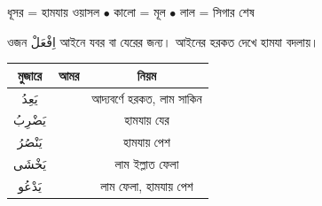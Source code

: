 \vspace{0.2cm}

\begin{center}
  {\small
    ধূসর = হামযায় ওয়াসল
    \enspace$\bullet$\enspace
    কালো = মূল
    \enspace$\bullet$\enspace
    লাল = সিগার শেষ
  }
\end{center}

\vspace{0.35cm}

\noindent ওজন {\arabicfont \textarabic{اِفْعَلْ}} আইনে যবর বা যেরের জন্য।
আইনের হরকত দেখে হামযা বদলায়।

\vspace{0.2cm}

\begingroup
\setlength{\arrayrulewidth}{0.5pt}
\setlength{\tabcolsep}{3pt}
\renewcommand{\arraystretch}{1.7}

\noindent\begin{tabularx}{\textwidth}{|C|C|C|}
  \hline
  {\color{white}\textbf{মুজারে}} &
  {\color{white}\textbf{আমর}} &
  {\color{white}\textbf{নিয়ম}} \\
  \hline
  {\arabicfont \textarabic{يَعِدُ}} &
  {\arabicfont {}} &
  আদ্যবর্ণে হরকত, লাম সাকিন \\
  \hline
  {\arabicfont \textarabic{يَضْرِبُ}} &
  {\arabicfont {}} &
  হামযায় যের \\
  \hline
  {\arabicfont \textarabic{يَنْصُرُ}} &
  {\arabicfont {}} &
  হামযায় পেশ \\
  \hline
  {\arabicfont \textarabic{يَخْشَى}} &
  {\arabicfont \textarabic{}} &
  লাম ইল্লাত ফেলা \\
  \hline
  {\arabicfont \textarabic{يَدْعُو}} &
  {\arabicfont \textarabic{}} &
  লাম ফেলা, হামযায় পেশ \\
  \hline
\end{tabularx}
\endgroup
